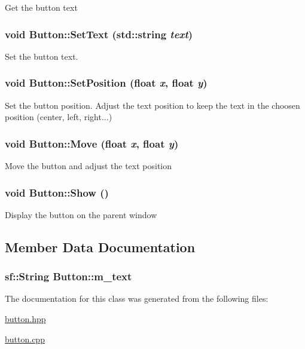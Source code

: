 Get the button text \hypertarget{classButton_e27547f223b15252190703b02631fe6e}{
\subsubsection[SetText]{\setlength{\rightskip}{0pt plus 5cm}void Button::SetText (std::string {\em text})}}
\label{classButton_e27547f223b15252190703b02631fe6e}




Set the button text. \hypertarget{classButton_1eca1f2d8b1948d54f6962a303773432}{
\subsubsection[SetPosition]{\setlength{\rightskip}{0pt plus 5cm}void Button::SetPosition (float {\em x}, \/  float {\em y})}}
\label{classButton_1eca1f2d8b1948d54f6962a303773432}




Set the button position. Adjust the text position to keep the text in the choosen position (center, left, right...) \hypertarget{classButton_4e1a77ff60e992d02841cd6de1585e2d}{
\subsubsection[Move]{\setlength{\rightskip}{0pt plus 5cm}void Button::Move (float {\em x}, \/  float {\em y})}}
\label{classButton_4e1a77ff60e992d02841cd6de1585e2d}




Move the button and adjust the text position \hypertarget{classButton_eb5dc1523ca4a12aea9be762abbeadda}{
\subsubsection[Show]{\setlength{\rightskip}{0pt plus 5cm}void Button::Show ()}}
\label{classButton_eb5dc1523ca4a12aea9be762abbeadda}




Display the button on the parent window 

\subsection{Member Data Documentation}
\hypertarget{classButton_524d038c09c3f5f819d5cae310a591e9}{
\subsubsection[m\_\-text]{\setlength{\rightskip}{0pt plus 5cm}sf::String {\bf Button::m\_\-text}}}
\label{classButton_524d038c09c3f5f819d5cae310a591e9}




The documentation for this class was generated from the following files:\begin{CompactItemize}
\item 
\hyperlink{button_8hpp}{button.hpp}\item 
\hyperlink{button_8cpp}{button.cpp}\end{CompactItemize}
